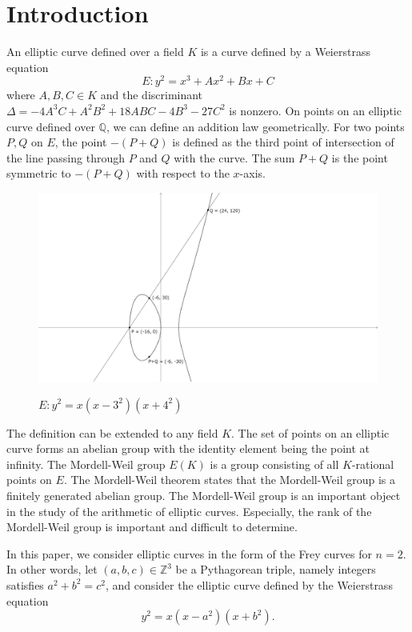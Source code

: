 \documentclass[a4paper]{jarticle} %
\theoremstyle{definition}
\theoremstyle{remark}
\begin{document}
\section{Introduction}
An elliptic curve defined over a field $K$ is a curve defined by a Weierstrass equation
\begin{equation*}
    E: y^{2} = x^{3} + Ax^2 + Bx + C
\end{equation*}
where $A,B,C \in K$ and the discriminant $\Delta = -4A^3C + A^2B^2 + 18ABC - 4B^3 - 27C^2$ is nonzero.
On points on an elliptic curve defined over $\mathbb{Q}$, we can define an addition law geometrically.
For two points $P,Q$ on $E$, the point $-(P+Q)$ is defined as the third point of intersection of the line passing through $P$ and $Q$ with the curve.
The sum $P+Q$ is the point symmetric to $-(P+Q)$ with respect to the $x$-axis.
\begin{figure}[ht]
    \centering
    \caption{$E: y^2 = x(x-3^2)(x+4^2)$}
    \includegraphics[keepaspectratio, width=\linewidth]{figures/3-4-5.png}
    \label{fig:elliptic_curve}
\end{figure}

The definition can be extended to any field $K$.
The set of points on an elliptic curve forms an abelian group with the identity element being the point at infinity.
The Mordell-Weil group $E(K)$ is a group consisting of all $K$-rational points on $E$.
The Mordell-Weil theorem states that the Mordell-Weil group is a finitely generated abelian group.
The Mordell-Weil group is an important object in the study of the arithmetic of elliptic curves.
Especially, the rank of the Mordell-Weil group is important and difficult to determine.

In this paper, we consider elliptic curves in the form of the Frey curves for $n=2$.
In other words, let $(a,b,c) \in \mathbb{Z}^3$ be a Pythagorean triple, namely integers satisfies $a^{2} + b^{2} = c^{2}$, and consider the elliptic curve defined by the Weierstrass equation
\begin{equation}
    \label{eq:2frey}
    y^{2} = x(x - a^{2})(x + b^{2}).
\end{equation}
\end{document}
